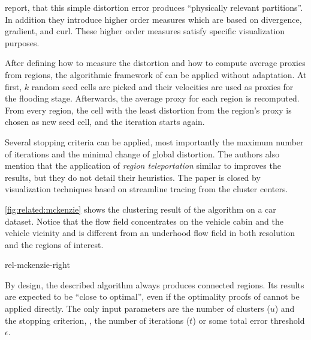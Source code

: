  report, that this simple distortion error produces ``physically relevant partitions''. In addition they introduce higher order measures which are based on divergence, gradient, and curl. These higher order measures satisfy specific visualization purposes.

After defining how to measure the distortion and how to compute average proxies from regions, the algorithmic framework of  can be applied without adaptation. At first, $k$ random seed cells are picked and their velocities are used as proxies for the flooding stage. Afterwards, the average proxy for each region is recomputed. From every region, the cell with the least distortion from the region's proxy is chosen as new seed cell, and the iteration starts again. 

Several stopping criteria can be applied, most importantly the maximum number of iterations and the minimal change of global distortion. The authors also mention that the application of \emph{region teleportation} similar to  improves the results, but they do not detail their heuristics.
The paper is closed by visualization techniques based on streamline tracing from the cluster centers.

\autoref{fig:related:mckenzie} shows the clustering result of the algorithm on a \threed car dataset. Notice that the flow field concentrates on the vehicle cabin and the vehicle vicinity and is different from an underhood flow field in both resolution and the regions of interest.

{rel-mckenzie-right}

By design, the described algorithm always produces connected regions. Its results are expected to be ``close to optimal'', even if the optimality proofs of \kMeans cannot be applied directly. The only input parameters are the number of clusters ($u$) and the stopping criterion, \ie, the number of iterations ($t$) or some total error threshold $\epsilon$.

